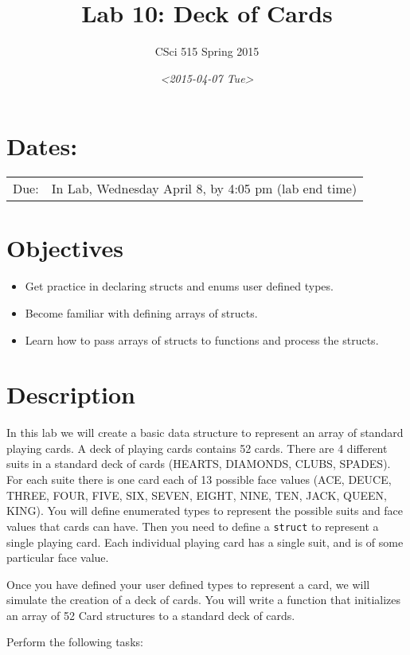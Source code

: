 \documentclass[11pt]{article}
\author{CSci 515 Spring 2015}
\date{\textit{<2015-04-07 Tue>}}
\title{Lab 10: Deck of Cards}
\begin{document}
\maketitle

\section*{Dates:}
\label{sec-1}
\begin{center}
\begin{tabular}{ll}
Due: & In Lab, Wednesday April 8, by 4:05 pm (lab end time)\\
\end{tabular}
\end{center}
\section*{Objectives}
\label{sec-2}
\begin{itemize}
\item Get practice in declaring structs and enums user defined
types.
\item Become familiar with defining arrays of structs.
\item Learn how to pass arrays of structs to functions and process
the structs.
\end{itemize}
\section*{Description}
\label{sec-3}
In this lab we will create a basic data structure to represent
an array of standard playing cards.  A deck of playing
cards contains 52 cards.  There are 4 different suits
in a standard deck of cards (HEARTS, DIAMONDS, CLUBS, SPADES).
For each suite there is one card each of 13 possible face
values (ACE, DEUCE, THREE, FOUR, FIVE, SIX, SEVEN, EIGHT, NINE,
TEN, JACK, QUEEN, KING).  You will define enumerated types
to represent the possible suits and face values that cards
can have.  Then you need to define a \verb~struct~ to represent
a single playing card. Each individual playing card has
a single suit, and is of some particular face value.

Once you have defined your user defined types to represent a card, we
will simulate the creation of a deck of cards.  You will write a
function that initializes an array of 52 Card structures to a standard
deck of cards.

Perform the following tasks:
\end{document}
